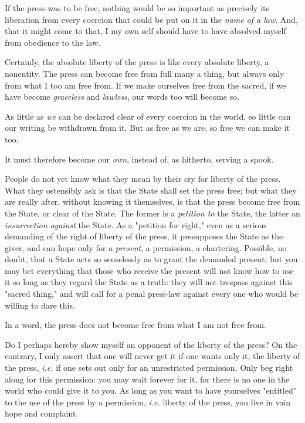 If the press was to be free, nothing would be so important as precisely its 
liberation from every coercion that could be put on it in the \textit{name of 
a law}. And, that it might come to that, I my own self should have to have 
absolved myself from obedience to the law.

Certainly, the absolute liberty of the press is like every absolute liberty, a 
nonentity. The press can become free from full many a thing, but always only 
from what I too am free from. If we make ourselves free from the sacred, if we 
have become \textit{graceless} and \textit{lawless}, our words too will become 
so.

As little as \textit{we} can be declared clear of every coercion in the world, 
so little can our writing be withdrawn from it. But as free as we are, so free 
we can make it too.

It must therefore become our \textit{own}, instead of, as hitherto, serving a 
spook.

People do not yet know what they mean by their cry for liberty of the press. 
What they ostensibly ask is that the State shall set the press free; but what 
they are really after, without knowing it themselves, is that the press become 
free from the State, or clear of the State. The former is a \textit{petition 
to} the State, the latter an \textit{insurrection against} the State. As a 
"{}petition for right,"{} even as a serious demanding of the right of liberty 
of the press, it presupposes the State as the giver, and can hope only for a 
\textit{present}, a permission, a chartering. Possible, no doubt, that a State 
acts so senselessly as to grant the demanded present; but you may bet 
everything that those who receive the present will not know how to use it so 
long as they regard the State as a truth: they will not trespass against this 
"{}sacred thing,"{} and will call for a penal press-law against every one who 
would be willing to dare this.

In a word, the press does not become free from what I am not free from.

Do I perhaps hereby show myself an opponent of the liberty of the press? On 
the contrary, I only assert that one will never get it if one wants only it, 
the liberty of the press, \textit{i.e.} if one sets out only for an 
unrestricted permission. Only beg right along for this permission: you may 
wait forever for it, for there is no one in the world who could give it to 
you. As long as you want to have yourselves "{}entitled"{} to the use of the 
press by a permission, \textit{i.e.} liberty of the press, you live in vain 
hope and complaint.

